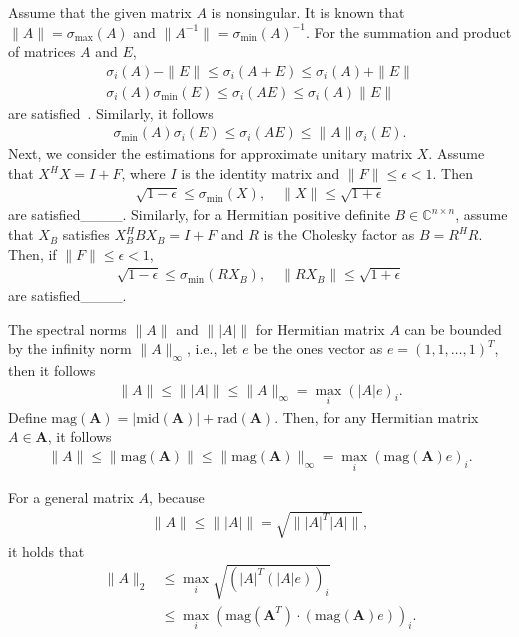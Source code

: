Assume that the given matrix $A$ is nonsingular.
It is known that $\|A\|=\sigma_{\max}(A)$ and $\|A^{-1}\|=\sigma_{\min}(A)^{-1}$.
For the summation and product of matrices $A$ and $E$,
\begin{align}
    \sigma_i(A)-\|E\|\leq \sigma_i(A+E)\leq \sigma_i(A)+\|E\|\label{eq:sum}\\
    \sigma_i(A)\sigma_{\min}(E)\leq \sigma_i(AE)\leq \sigma_i(A)\|E\|\label{eq:prod}
\end{align}
are satisfied~\cite[Theorem 3.3.16]{horn1994topics}.
Similarly, it follows 
\begin{align}
    \sigma_{\min}(A)\sigma_{i}(E)\leq \sigma_i(AE)\leq \|A\|\sigma_{i}(E).\label{eq:prod2}
\end{align}
Next, we consider the estimations for approximate unitary matrix $X$.
Assume that $X^HX=I+F$, where $I$ is the identity matrix and $\|F\|\leq \epsilon<1$.
Then
\begin{align}
    \sqrt{1-\epsilon}\leq \sigma_{\min}(X),\quad \|X\|\leq \sqrt{1+\epsilon}
\end{align}
are satisfied____.
Similarly, for a Hermitian positive definite $B\in\mathbb{C}^{n\times n}$, assume that $X_B$ satisfies $X_B^HBX_B=I+F$ and $R$ is the Cholesky factor as $B=R^HR$.
Then, if $\|F\|\leq \epsilon<1$,
\begin{align}
    \sqrt{1-\epsilon}\leq \sigma_{\min}(RX_B),\quad \|RX_B\|\leq \sqrt{1+\epsilon}\label{eq:borth}
\end{align}
are satisfied____.

The spectral norms $\|A\|$ and $\||A|\|$ for Hermitian matrix $A$ can be bounded by the infinity norm $\|A\|_{\infty}$, i.e., 
let $e$ be the ones vector as $e=(1,1,\dots,1)^T$, then it follows
\begin{align}
    \|A\|\leq \||A|\|\leq \|A\|_{\infty}=\max_i(|A|e)_i.
\end{align}
Define $\mathrm{mag}(\bm A)=|\mathrm{mid}(\bm A)|+\mathrm{rad}(\bm A)$.
Then, for any Hermitian matrix $A\in\bm A$, it follows
\begin{align}
    \|A\|\leq \|\mathrm{mag}(\bm A)\|\leq \|\mathrm{mag}(\bm A)\|_{\infty}=\max_i(\mathrm{mag}(\bm A)e)_i.
\end{align}

For a general matrix $A$, because
\begin{align}
    \|A\|\leq \||A|\|=\sqrt{\||A|^T|A|\|},
\end{align}
it holds that
\begin{align}
    \|A\|_2&\leq \max_{i}\sqrt{(|A|^T(|A|e))_i}\\
    &\leq\max_i(\mathrm{mag}(\bm A^T)\cdot(\mathrm{mag}(\bm A)e))_i.
\end{align}


